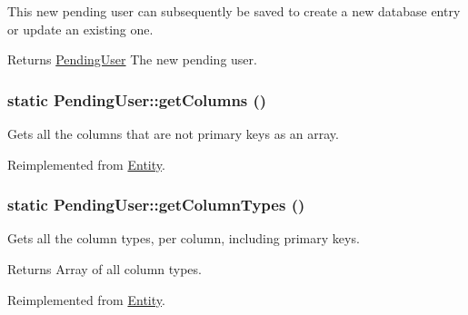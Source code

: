 This new pending user can subsequently be saved to create a new database entry or update an existing one.

\begin{DoxyReturn}{Returns}
\hyperlink{classPendingUser}{PendingUser} The new pending user. 
\end{DoxyReturn}
\hypertarget{classPendingUser_a16417ee5731d54b92514e5af71fc715e}{
\subsubsection[{getColumns}]{\setlength{\rightskip}{0pt plus 5cm}static PendingUser::getColumns ()}}
\label{classPendingUser_a16417ee5731d54b92514e5af71fc715e}
Gets all the columns that are not primary keys as an array. 

Reimplemented from \hyperlink{classEntity_a394717a08ffd54ec9a14d06727c86719}{Entity}.

\hypertarget{classPendingUser_ab157c3fddef5e3fc0e85f40a66033f78}{
\subsubsection[{getColumnTypes}]{\setlength{\rightskip}{0pt plus 5cm}static PendingUser::getColumnTypes ()}}
\label{classPendingUser_ab157c3fddef5e3fc0e85f40a66033f78}
Gets all the column types, per column, including primary keys.

\begin{DoxyReturn}{Returns}
Array of all column types. 
\end{DoxyReturn}


Reimplemented from \hyperlink{classEntity_ad69437219c10955803707fbf6ac458e7}{Entity}.


